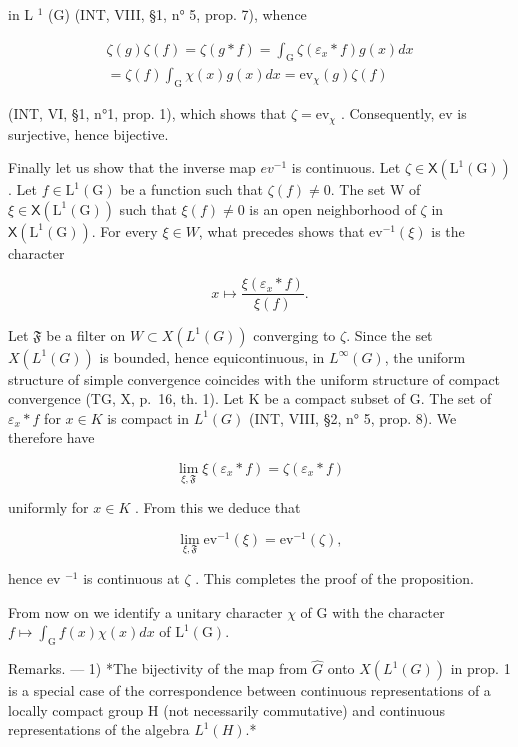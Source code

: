 in L \(^{1}\) (G) (INT, VIII, §1, n° 5, prop. 7), whence

\[
\begin{array}{c} \zeta (g) \zeta (f) = \zeta (g * f) = \int_ {\mathrm{G}} \zeta (\varepsilon_ {x} * f) g (x) d x \\ = \zeta (f) \int_ {\mathrm{G}} \chi (x) g (x) d x = \mathrm{ev} _ {\chi} (g) \zeta (f) \end{array}
\]

(INT, VI, §1, n°1, prop. 1), which shows that \(\zeta = \mathrm{ev}_{\chi}\) . Consequently, ev is surjective, hence bijective.

Finally let us show that the inverse map \(ev^{-1}\) is continuous. Let \(\zeta \in \mathsf{X}(\mathrm{L}^{1}(\mathrm{G}))\). Let \(f \in \mathrm{L}^{1}(\mathrm{G})\) be a function such that \(\zeta(f) \neq 0\). The set W of \(\xi \in \mathsf{X}(\mathrm{L}^{1}(\mathrm{G}))\) such that \(\xi(f) \neq 0\) is an open neighborhood of \(\zeta\) in \(\mathsf{X}(\mathrm{L}^{1}(\mathrm{G}))\). For every \(\xi \in W\), what precedes shows that \(\mathrm{ev}^{-1}(\xi)\) is the character

\[
x \mapsto \frac {\xi (\varepsilon_ {x} * f)}{\xi (f)}.
\]

Let \(\mathfrak{F}\) be a filter on \(W \subset X(L^{1}(G))\) converging to \(\zeta\). Since the set \(X(L^{1}(G))\) is bounded, hence equicontinuous, in \(L^{\infty}(G)\), the uniform structure of simple convergence coincides with the uniform structure of compact convergence (TG, X, p.~16, th. 1). Let K be a compact subset of G. The set of \(\varepsilon_{x} * f\) for \(x \in K\) is compact in \(L^{1}(G)\) (INT, VIII, §2, n° 5, prop. 8). We therefore have

\[
\lim _ {\xi , \mathfrak {F}} \xi (\varepsilon_ {x} * f) = \zeta (\varepsilon_ {x} * f)
\]

uniformly for \(x \in K\) . From this we deduce that

\[
\lim _ {\xi , \mathfrak {F}} \mathrm{ev} ^ {- 1} (\xi) = \mathrm{ev} ^ {- 1} (\zeta),
\]

hence ev \(^{-1}\) is continuous at \(\zeta\) . This completes the proof of the proposition.

From now on we identify a unitary character \(\chi\) of G with the character \(f\mapsto\int_{\mathrm{G}}f(x)\chi(x)dx\) of \(\mathrm{L}^{1}(\mathrm{G})\).

Remarks. --- 1) *The bijectivity of the map from \(\widehat{G}\) onto \(X(L^{1}(G))\) in prop. 1 is a special case of the correspondence between continuous representations of a locally compact group H (not necessarily commutative) and continuous representations of the algebra \(L^{1}(H)\).*


